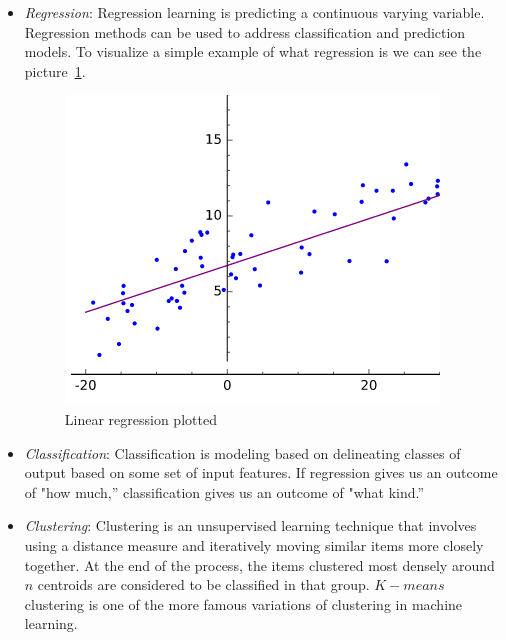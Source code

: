 \begin{itemize}
	\item \textit{Regression}: Regression learning is predicting a continuous varying variable. Regression methods can be used to address classification and prediction models. To visualize a simple example of what regression is we can see the picture~\cref{fig:regresion}.
	\begin{figure}
		\includegraphics[width=\linewidth]{img/regression.png}
		\caption{Linear regression plotted~\cite{tfidf}}
		\label{fig:regresion}
	\end{figure}
	\item \textit{Classification}: Classification is modeling based on delineating classes of output based on some set of input features. If regression gives us an outcome of "how much,” classification gives us an outcome of "what kind.”
	\item \textit{Clustering}: Clustering is an unsupervised learning technique that involves using a distance measure and iteratively moving similar items more closely together. At the end of the process, the items clustered most densely around $n$ centroids are considered to be classified in that group. $K-means$ clustering is one of the more famous variations of clustering in machine learning. 
\end{itemize} 

